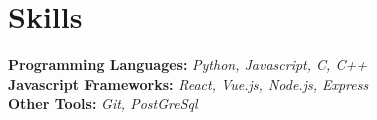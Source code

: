 \documentclass[letterpaper,12pt]{article} %
\begin{document}
\section{Skills}
\begin{itemize}[leftmargin=0.15in, label={}]
  \small{\item{
        \textbf{Programming Languages: }{\emph{Python, Javascript, C, C++}} \\
        \textbf{Javascript Frameworks: }{\emph{React, Vue.js, Node.js, Express}} \\
        \textbf{Other Tools: }{\emph{Git, PostGreSql}} \\
        }}
\end{itemize}

\end{document}
